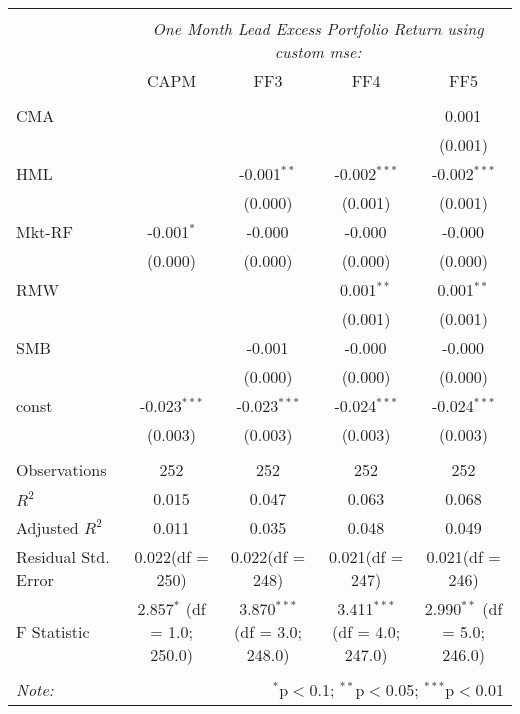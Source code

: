 \begin{table}[!htbp] \centering
\begin{tabular}{@{\extracolsep{5pt}}lcccc}
\\[-1.8ex]\hline
\hline \\[-1.8ex]
& \multicolumn{4}{c}{\textit{One Month Lead Excess Portfolio Return using custom mse:}} \
\cr \cline{4-5}
\\[-1.8ex] & CAPM & FF3 & FF4 & FF5 \\
\hline \\[-1.8ex]
 CMA & & & & 0.001$^{}$ \\
  & & & & (0.001) \\
 HML & & -0.001$^{**}$ & -0.002$^{***}$ & -0.002$^{***}$ \\
  & & (0.000) & (0.001) & (0.001) \\
 Mkt-RF & -0.001$^{*}$ & -0.000$^{}$ & -0.000$^{}$ & -0.000$^{}$ \\
  & (0.000) & (0.000) & (0.000) & (0.000) \\
 RMW & & & 0.001$^{**}$ & 0.001$^{**}$ \\
  & & & (0.001) & (0.001) \\
 SMB & & -0.001$^{}$ & -0.000$^{}$ & -0.000$^{}$ \\
  & & (0.000) & (0.000) & (0.000) \\
 const & -0.023$^{***}$ & -0.023$^{***}$ & -0.024$^{***}$ & -0.024$^{***}$ \\
  & (0.003) & (0.003) & (0.003) & (0.003) \\
\hline \\[-1.8ex]
 Observations & 252 & 252 & 252 & 252 \\
 $R^2$ & 0.015 & 0.047 & 0.063 & 0.068 \\
 Adjusted $R^2$ & 0.011 & 0.035 & 0.048 & 0.049 \\
 Residual Std. Error & 0.022(df = 250) & 0.022(df = 248) & 0.021(df = 247) & 0.021(df = 246)  \\
 F Statistic & 2.857$^{*}$ (df = 1.0; 250.0) & 3.870$^{***}$ (df = 3.0; 248.0) & 3.411$^{***}$ (df = 4.0; 247.0) & 2.990$^{**}$ (df = 5.0; 246.0) \\
\hline
\hline \\[-1.8ex]
\textit{Note:} & \multicolumn{4}{r}{$^{*}$p$<$0.1; $^{**}$p$<$0.05; $^{***}$p$<$0.01} \\
\end{tabular}
\end{table}
